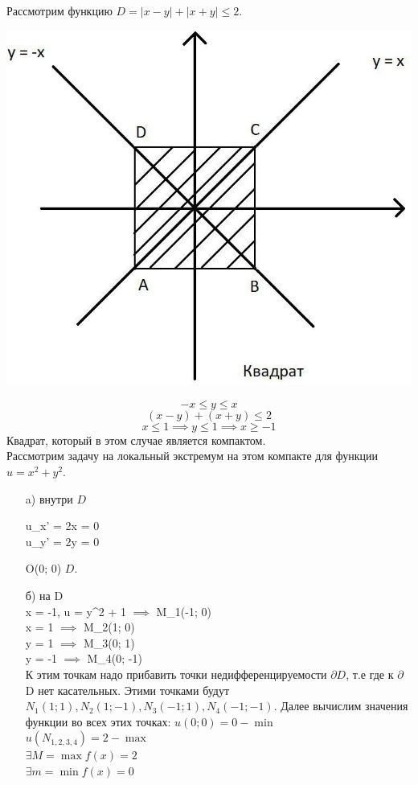 \documentclass[../../main.tex]{subfiles}
\begin{document}
	\begin{exmp}
		Рассмотрим функцию $D = |x - y| + |x + y| \leq 2$.
		\begin{center}
			\includegraphics[scale = 0.7]{square.jpg}
		\end{center}
		\[-x \leq y \leq x \]
		\[(x - y) + (x + y) \leq 2\]
		\[ x \leq 1 \implies y \leq 1  \implies x \geq -1\]
		Квадрат, который в этом случае является компактом.\\
		Рассмотрим задачу на локальный экстремум на этом компакте для функции $u = x^2 + y^2$. 
		\begin{enumerate}
			\item[a)] внутри $D$\\
			\begin{cases}
				u_{x}' = 2x = 0\\
				u_{y}' = 2y = 0\\
			\end{cases} \implies O(0; 0) \in $D$.\\
			
			\item[б)] на \partial D \\
			x = -1, u = y^2 + 1 $\implies$ M_1(-1; 0)\\
			x = 1 $\implies$ M_2(1; 0)\\
			y = 1 $\implies$ M_3(0; 1)\\
			y = -1 $\implies$ M_4(0; -1)\\
			К этим точкам надо прибавить точки недифференцируемости $\partial D$, т.е где к $\partial$ D нет касательных. 
			Этими точками будут $N_1(1; 1), N_2(1; -1), N_3(-1; 1), N_4(-1; -1)$.
			Далее вычислим значения функции во всех этих точках:
			$u(0; 0) = 0 - \min$\\
			$u(N_{1, 2, 3, 4}) = 2 - \max$\\
			$\exists M = \max f(x) = 2$\\
			$\exists m = \min f(x) = 0$
		\end{enumerate}
	\end{exmp}
	
	
\end{document}

